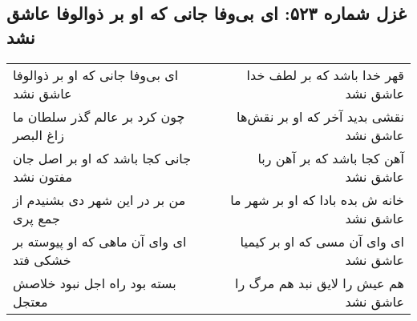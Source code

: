 \begin{center}
\section*{غزل شماره ۵۲۳: ای بی‌وفا جانی که او بر ذوالوفا عاشق نشد}
\label{sec:0523}
\begin{longtable}{l p{0.5cm} r}
ای بی‌وفا جانی که او بر ذوالوفا عاشق نشد
&&
قهر خدا باشد که بر لطف خدا عاشق نشد
\\
چون کرد بر عالم گذر سلطان ما زاغ البصر
&&
نقشی بدید آخر که او بر نقش‌ها عاشق نشد
\\
جانی کجا باشد که او بر اصل جان مفتون نشد
&&
آهن کجا باشد که بر آهن ربا عاشق نشد
\\
من بر در این شهر دی بشنیدم از جمع پری
&&
خانه ش بده بادا که او بر شهر ما عاشق نشد
\\
ای وای آن ماهی که او پیوسته بر خشکی فتد
&&
ای وای آن مسی که او بر کیمیا عاشق نشد
\\
بسته بود راه اجل نبود خلاصش معتجل
&&
هم عیش را لایق نبد هم مرگ را عاشق نشد
\\
\end{longtable}
\end{center}
